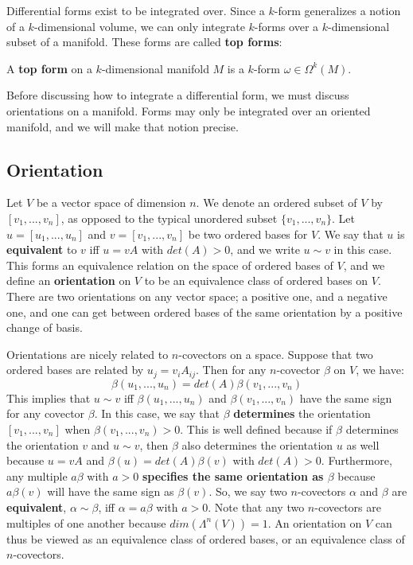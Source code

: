Differential forms exist to be integrated over. Since a $k$-form generalizes a notion of a $k$-dimensional volume, we 
can only integrate $k$-forms over a $k$-dimensional subset of a manifold. These forms are called \textbf{top forms}:
\begin{definition}
	A \textbf{top form} on a $k$-dimensional manifold $M$ is a $k$-form $\omega\in\Omega^k(M)$. 
\end{definition}
Before discussing how to integrate a differential form, we must discuss orientations on a manifold. Forms may only be 
integrated over an oriented manifold, and we will make that notion precise.

\subsection{Orientation}

Let $V$ be a vector space of dimension $n$. We denote an ordered subset of $V$ by $[v_1, ..., v_n]$, as opposed to the 
typical unordered subset $\{v_1, ..., v_n\}$. Let $u = [u_1, ..., u_n]$ and $v = [v_1, ..., v_n]$ be two ordered bases for $V$. 
We say that $u$ is \textbf{equivalent} to $v$ iff $u = vA$ with $det(A) > 0$, and we write $u\sim v$ in this case. This forms an 
equivalence relation on the space of ordered bases of $V$, and we define an \textbf{orientation} on $V$ to be an equivalence 
class of ordered bases on $V$. There are two orientations on any vector space; a positive one, and a negative one, and one 
can get between ordered bases of the same orientation by a positive change of basis. 

Orientations are nicely related to $n$-covectors on a space. Suppose that two ordered bases are related by $u_j = v_i A_{ij}$. 
Then for any $n$-covector $\beta$ on $V$, we have:
\begin{equation}
	\beta(u_1, ..., u_n) = det(A)\beta(v_1, ..., v_n)
\end{equation}
This implies that $u\sim v$ iff $\beta(u_1, ..., u_n)$ and $\beta(v_1, ..., v_n)$ have the same sign for any covector 
$\beta$. In this case, we say that $\beta$ \textbf{determines} the orientation $[v_1, ..., v_n]$ when $\beta(v_1, ..., v_n) > 0$. 
This is well defined because if $\beta$ determines the orientation $v$ and $u\sim v$, then $\beta$ also determines the 
orientation $u$ as well because $u = vA$ and $\beta(u) = det(A)\beta(v)$ with $det(A) > 0$. Furthermore, any 
multiple $a\beta$ with $a > 0$ \textbf{specifies the same orientation as $\beta$} because $a\beta(v)$ will have the 
same sign as $\beta(v)$. So, we say two $n$-covectors $\alpha$ and $\beta$ are \textbf{equivalent}, $\alpha\sim\beta$, 
iff $\alpha = a\beta$ with $a > 0$. Note that any two $n$-covectors are multiples of one another because $dim(\Lambda^n(V)) 
= 1$. An orientation on $V$ can thus be viewed as an equivalence class of ordered bases, or an equivalence class of 
$n$-covectors. 

